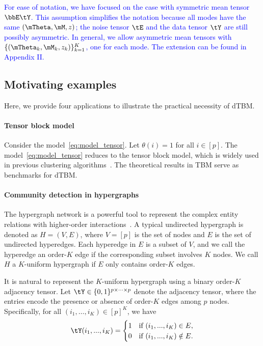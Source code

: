 \documentclass[lettersize,onecolumn,journal]{IEEEtran}
\theoremstyle{definition}
\theoremstyle{definition}
\begin{document}
\textcolor{blue}{For ease of notation, we have focused on the case with symmetric mean tensor $\bbE \tY$. This assumption simplifies the notation because all modes have the same $(\mTheta, \mM, z)$; the noise tensor $\tE$ and the data tensor $\tY$ are still possibly asymmetric. In general, we allow asymmetric mean tensors with $\{(\mTheta_k, \mM_k, z_k)\}_{k=1}^K$, one for each mode. The extension can be found in Appendix II.}

\subsection{Motivating examples}\label{subsec:motiv} Here, we provide four applications to illustrate the practical necessity of dTBM.

\vspace{0.2cm}
\paragraph{Tensor block model} Consider the model~\eqref{eq:model_tensor}. Let $\theta(i)=1$ for all $ i \in [p]$. The model~\eqref{eq:model_tensor} reduces to the tensor block model, which is widely used in previous clustering algorithms~\citep{wang2019multiway,chi2020provable,han2020exact}. The theoretical results in TBM serve as benchmarks for dTBM.  

\vspace{0.2cm}

\paragraph{Community detection in hypergraphs} The hypergraph network is a powerful tool to represent the complex entity relations with higher-order interactions~\citep{ke2019community}. A typical undirected hypergraph is denoted as $H = (V,E)$, where $V = [p]$ is the set of nodes and $E$ is the set of undirected hyperedges. Each hyperedge in $E$ is a subset of $V$, and we call the hyperedge an order-$K$ edge if the corresponding subset involves $K$ nodes. We call $H$ a $K$-uniform hypergraph if $E$ only contains order-$K$ edges. 

It is natural to represent the $K$-uniform hypergraph using a binary order-$K$ adjacency tensor. Let $\tY \in \{0,1\}^{p \times \cdots \times p}$ denote the adjacency tensor, where the entries encode the presence or absence of order-$K$ edges among $p$ nodes. Specifically, for all $(i_1,\ldots,i_K) \in [p]^K$, we have
\begin{equation}
    \tY(i_1,...,i_K) =  \begin{cases}
    1  & \text{if }  (i_1,...,i_K) \in E,\\
    0 & \text{if }  (i_1,...,i_K) \notin E.
    \end{cases}
\end{equation}
\end{document}
